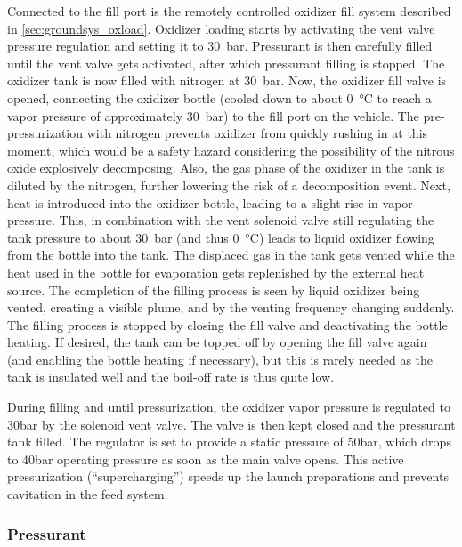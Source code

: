 Connected to the fill port is the remotely controlled oxidizer fill system described in \cref{sec:groundsys_oxload}.
Oxidizer loading starts by activating the vent valve pressure regulation and setting it to \SI{30}{\bar}. Pressurant is then carefully filled until the vent valve gets activated, after which pressurant filling is stopped. The oxidizer tank is now filled with nitrogen at \SI{30}{\bar}.
Now, the oxidizer fill valve is opened, connecting the oxidizer bottle (cooled down to about \SI{0}{\celsius} to reach a vapor pressure of approximately \SI{30}{\bar}) to the fill port on the vehicle. The pre-pressurization with nitrogen prevents oxidizer from quickly rushing in at this moment, which would be a safety hazard considering the possibility of the nitrous oxide explosively decomposing. Also, the gas phase of the oxidizer in the tank is diluted by the nitrogen, further lowering the risk of a decomposition event. Next, heat is introduced into the oxidizer bottle, leading to a slight rise in vapor pressure. This, in combination with the vent solenoid valve still regulating the tank pressure to about \SI{30}{\bar} (and thus \SI{0}{\celsius}) leads to liquid oxidizer flowing from the bottle into the tank. The displaced gas in the tank gets vented while the heat used in the bottle for evaporation gets replenished by the external heat source.
The completion of the filling process is seen by liquid oxidizer being vented, creating a visible plume, and by the venting frequency changing suddenly. The filling process is stopped by closing the fill valve and deactivating the bottle heating.
If desired, the tank can be topped off by opening the fill valve again (and enabling the bottle heating if necessary), but this is rarely needed as the tank is insulated well and the boil-off rate is thus quite low.

During filling and until pressurization, the oxidizer vapor pressure is regulated to 30bar by the solenoid vent valve. The valve is then kept closed and the pressurant tank filled. The regulator is set to provide a static pressure of 50bar, which drops to 40bar operating pressure as soon as the main valve opens. This active pressurization (“supercharging”) speeds up the launch preparations and prevents cavitation in the feed system.

\subsubsection{Pressurant}\label{sec:prop_pressfill}

